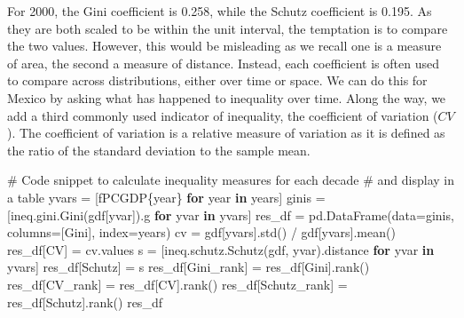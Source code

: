 \documentclass[
  a4paper, 
  twoside,
  final
]{article}
\newenvironment{Shaded}{\begin{snugshade}}{\end{snugshade}}
\newcommand{\CommentTok}[1]{\textcolor[rgb]{0.37,0.37,0.37}{#1}}
\newcommand{\ControlFlowTok}[1]{\textcolor[rgb]{0.00,0.23,0.31}{\textbf{#1}}}
\newcommand{\KeywordTok}[1]{\textcolor[rgb]{0.00,0.23,0.31}{\textbf{#1}}}
\newcommand{\NormalTok}[1]{\textcolor[rgb]{0.00,0.23,0.31}{#1}}
\newcommand{\OperatorTok}[1]{\textcolor[rgb]{0.37,0.37,0.37}{#1}}
\newcommand{\SpecialCharTok}[1]{\textcolor[rgb]{0.37,0.37,0.37}{#1}}
\newcommand{\SpecialStringTok}[1]{\textcolor[rgb]{0.13,0.47,0.30}{#1}}
\newcommand{\StringTok}[1]{\textcolor[rgb]{0.13,0.47,0.30}{#1}}
\begin{document}
For 2000, the Gini coefficient is 0.258, while the Schutz coefficient is
0.195. As they are both scaled to be within the unit interval, the
temptation is to compare the two values. However, this would be
misleading as we recall one is a measure of area, the second a measure
of distance. Instead, each coefficient is often used to compare across
distributions, either over time or space. We can do this for Mexico by
asking what has happened to inequality over time. Along the way, we add
a third commonly used indicator of inequality, the coefficient of
variation (\(CV\)). The coefficient of variation is a relative measure
of variation as it is defined as the ratio of the standard deviation to
the sample mean.

\begin{Shaded}
\begin{Highlighting}[]
\CommentTok{\# Code snippet to calculate inequality measures for each decade}
\CommentTok{\# and display in a table}
\NormalTok{yvars }\OperatorTok{=}\NormalTok{ [}\SpecialStringTok{f\textquotesingle{}PCGDP}\SpecialCharTok{\{}\NormalTok{year}\SpecialCharTok{\}}\SpecialStringTok{\textquotesingle{}} \ControlFlowTok{for}\NormalTok{ year }\KeywordTok{in}\NormalTok{ years]}
\NormalTok{ginis }\OperatorTok{=}\NormalTok{ [ineq.gini.Gini(gdf[yvar]).g }\ControlFlowTok{for}\NormalTok{ yvar }\KeywordTok{in}\NormalTok{ yvars]}
\NormalTok{res\_df }\OperatorTok{=}\NormalTok{ pd.DataFrame(data}\OperatorTok{=}\NormalTok{ginis, columns}\OperatorTok{=}\NormalTok{[}\StringTok{\textquotesingle{}Gini\textquotesingle{}}\NormalTok{], index}\OperatorTok{=}\NormalTok{years)}
\NormalTok{cv }\OperatorTok{=}\NormalTok{ gdf[yvars].std() }\OperatorTok{/}\NormalTok{ gdf[yvars].mean() }
\NormalTok{res\_df[}\StringTok{\textquotesingle{}CV\textquotesingle{}}\NormalTok{] }\OperatorTok{=}\NormalTok{ cv.values}
\NormalTok{s }\OperatorTok{=}\NormalTok{ [ineq.schutz.Schutz(gdf, yvar).distance }\ControlFlowTok{for}\NormalTok{ yvar }\KeywordTok{in}\NormalTok{ yvars]}
\NormalTok{res\_df[}\StringTok{\textquotesingle{}Schutz\textquotesingle{}}\NormalTok{] }\OperatorTok{=}\NormalTok{ s}
\NormalTok{res\_df[}\StringTok{\textquotesingle{}Gini\_rank\textquotesingle{}}\NormalTok{] }\OperatorTok{=}\NormalTok{ res\_df[}\StringTok{\textquotesingle{}Gini\textquotesingle{}}\NormalTok{].rank()}
\NormalTok{res\_df[}\StringTok{\textquotesingle{}CV\_rank\textquotesingle{}}\NormalTok{] }\OperatorTok{=}\NormalTok{ res\_df[}\StringTok{\textquotesingle{}CV\textquotesingle{}}\NormalTok{].rank()}
\NormalTok{res\_df[}\StringTok{\textquotesingle{}Schutz\_rank\textquotesingle{}}\NormalTok{] }\OperatorTok{=}\NormalTok{ res\_df[}\StringTok{\textquotesingle{}Schutz\textquotesingle{}}\NormalTok{].rank()}
\NormalTok{res\_df}
\end{Highlighting}
\end{Shaded}
\end{document}
